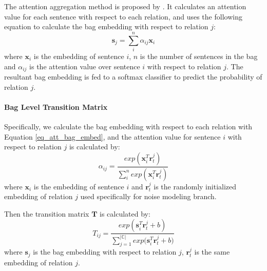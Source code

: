 The attention aggregation method is proposed by \cite{lin2016neural}. It calculates an attention value for each sentence with respect to each relation, and uses the following equation to calculate the bag embedding with respect to relation $j$:
\begin{equation}
\mathbf{s}_j = \sum_i^{n}{\alpha_{ij} \mathbf{x}_{i}}
\label{eq_att_bag_embed}
\end{equation}
where $\mathbf{x}_{i}$ is the embedding of sentence $i$, $n$ is the number of sentences in the bag and $\alpha_{ij}$ is the attention value over sentence $i$ with respect to relation $j$. The resultant bag embedding is fed to a softmax classifier to predict the probability of relation $j$.

\paragraph{Bag Level Transition Matrix}
 Specifically, we calculate the bag embedding with respect to each relation with Equation \ref{eq_att_bag_embed}, and the attention value for sentence $i$ with respect to relation $j$ is calculated by:
\begin{equation}
\alpha_{ij} = \frac{exp(\mathbf{x}_i^T \mathbf{r}_t^j)}{\sum_i^n{exp(\mathbf{x}_i^T \mathbf{r}_t^j)}}
\end{equation}
where $\mathbf{x}_i$ is the embedding of sentence $i$ and $\mathbf{r}_t^j$ is the randomly initialized embedding of relation $j$ used specifically for noise modeling branch.

Then the transition matrix $\mathbf{T}$ is calculated by:
\begin{equation}
T_{ij} = \frac{exp({\mathbf{s}_i^T \mathbf{r}_t^j  + b})}{\sum_{j=1}^{|\mathbb{C}|}{exp(\mathbf{s}_i^T \mathbf{r}_t^j + b})}
\end{equation}
where $\mathbf{s}_j$ is the bag embedding with respect to relation $j$, $\mathbf{r}_t^j$ is the same embedding of relation $j$.


